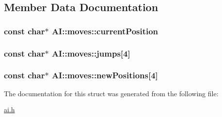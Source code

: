 \subsection{Member Data Documentation}
\hypertarget{struct_a_i_1_1moves_a736739fad02c378d6fd467d5eaf0926d}{
\subsubsection[{current\-Position}]{\setlength{\rightskip}{0pt plus 5cm}const char$\ast$ A\-I\-::moves\-::current\-Position}}\label{struct_a_i_1_1moves_a736739fad02c378d6fd467d5eaf0926d}
\hypertarget{struct_a_i_1_1moves_a243ff8ab759ff66204e2d2152851fa65}{
\subsubsection[{jumps}]{\setlength{\rightskip}{0pt plus 5cm}const char$\ast$ A\-I\-::moves\-::jumps\mbox{[}4\mbox{]}}}\label{struct_a_i_1_1moves_a243ff8ab759ff66204e2d2152851fa65}
\hypertarget{struct_a_i_1_1moves_a1a70af16b28de0cb7d83c07b6663c647}{
\subsubsection[{new\-Positions}]{\setlength{\rightskip}{0pt plus 5cm}const char$\ast$ A\-I\-::moves\-::new\-Positions\mbox{[}4\mbox{]}}}\label{struct_a_i_1_1moves_a1a70af16b28de0cb7d83c07b6663c647}


The documentation for this struct was generated from the following file\-:\begin{DoxyCompactItemize}
\item 
\hyperlink{ai_8h}{ai.\-h}\end{DoxyCompactItemize}
